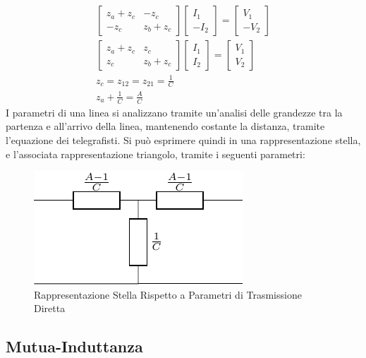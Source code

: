 \documentclass{article}
\numberwithin{equation}{subsection}
\begin{document}
\begin{gather*}
    \begin{bmatrix}
        z_a+z_c&-z_c\\-z_c&z_b+z_c
    \end{bmatrix}\begin{bmatrix}
        I_1\\-I_2
    \end{bmatrix}=\begin{bmatrix}
        V_1\\-V_2
    \end{bmatrix}\\
    \begin{bmatrix}
        z_a+z_c&z_c\\z_c&z_b+z_c
    \end{bmatrix}\begin{bmatrix}
        I_1\\I_2
    \end{bmatrix}=\begin{bmatrix}
        V_1\\V_2
    \end{bmatrix}\\
    z_c=z_{12}=z_{21}=\displaystyle\frac{1}{C}\\
    z_a+\displaystyle\frac{1}{C}=\frac{A}{C}
\end{gather*}
I parametri di una linea si analizzano tramite un'analisi delle grandezze tra la partenza e all'arrivo della linea, mantenendo costante la distanza, tramite l'equazione 
dei telegrafisti. Si può esprimere quindi in una rappresentazione stella, e l'associata rappresentazione triangolo, tramite i seguenti parametri:
\begin{figure}[ht]%
    \centering
    \includegraphics{rappresentazione-parametri-diretti-stella.pdf}
    \caption{Rappresentazione Stella Rispetto a Parametri di Trasmissione Diretta}
    \label{fig:rappresentazione-parametri-diretti-stella}
\end{figure}

\subsection{Mutua-Induttanza}
\end{document}
